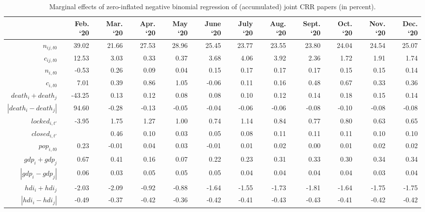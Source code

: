 \begin{landscape}

\begin{table}[ht]
\caption{Marginal effects of zero-inflated negative binomial regression of (accumulated) joint CRR papers (in percent).}
\label{tab:margEff}
\centering
\begin{threeparttable}
\begin{tabular}{rrrrrrrrrrrr}
  \hline
    & {\bf Feb. `20} & {\bf Mar. `20} & {\bf Apr. `20} &  {\bf May `20}  &  {\bf June `20} &  {\bf July `20} &  {\bf Aug. `20} &  {\bf Sept. `20} &  {\bf Oct. `20} &  {\bf Nov. `20} &  {\bf Dec. `20}   \\ 
  \hline
    $n_{ij,t0}$ & 39.02 & 21.66 & 27.53 & 28.96 & 25.45 & 23.77 & 23.55 & 23.80 & 24.04 & 24.54 & 25.07 \\ 
     $c_{ij,t0}$ & 12.53 & 3.03 & 0.33 & 0.37 & 3.68 & 4.06 & 3.92 & 2.36 & 1.72 & 1.91 & 1.74 \\ 
  $n_{i,t0}$  & -0.53 & 0.26 & 0.09 & 0.04 & 0.15 & 0.17 & 0.17 & 0.17 & 0.15 & 0.15 & 0.14 \\ 
     $c_{i,t0}$ & 7.01 & 0.39 & 0.86 & 1.05 & -0.06 & 0.11 & 0.16 & 0.48 & 0.67 & 0.33 & 0.36 \\ 
  $death_i + death_j$ & -43.25 & 0.13 & 0.12 & 0.08 & 0.08 & 0.10 & 0.12 & 0.14 & 0.18 & 0.15 & 0.14 \\ 
  $|death_i - death_j|$ & 94.60 & -0.28 & -0.13 & -0.05 & -0.04 & -0.06 & -0.06 & -0.08 & -0.10 & -0.08 & -0.08 \\ 
  $locked_{i,t'}$  & -3.95 & 1.75 & 1.27 & 1.00 & 0.74 & 1.14 & 0.84 & 0.77 & 0.80 & 0.63 & 0.65 \\
  $closed_{i,t'}$ &  & 0.46 & 0.10 & 0.03 & 0.05 & 0.08 & 0.11 & 0.11 & 0.11 & 0.10 & 0.10 \\ 
  $pop_{i,t0}$ & 0.23 & -0.01 & 0.04 & 0.03 & -0.01 & 0.01 & 0.02 & 0.00 & 0.01 & 0.02 & 0.02 \\
  $gdp_i + gdp_j$ & 0.67 & 0.41 & 0.16 & 0.07 & 0.22 & 0.23 & 0.31 & 0.33 & 0.30 & 0.34 & 0.34 \\ 
  $|gdp_i - gdp_j|$ & 0.06 & 0.03 & 0.05 & 0.05 & 0.05 & 0.04 & 0.04 & 0.04 & 0.04 & 0.03 & 0.04 \\
  $hdi_i + hdi_j$ & -2.03 & -2.09 & -0.92 & -0.88 & -1.64 & -1.55 & -1.73 & -1.81 & -1.64 & -1.75 & -1.75 \\ 
  $|hdi_i - hdi_j|$  & -0.49 & -0.37 & -0.42 & -0.36 & -0.42 & -0.41 & -0.43 & -0.43 & -0.41 & -0.42 & -0.42 \\ 

\end{tabular}
\end{threeparttable}
\end{table}
\end{landscape}
